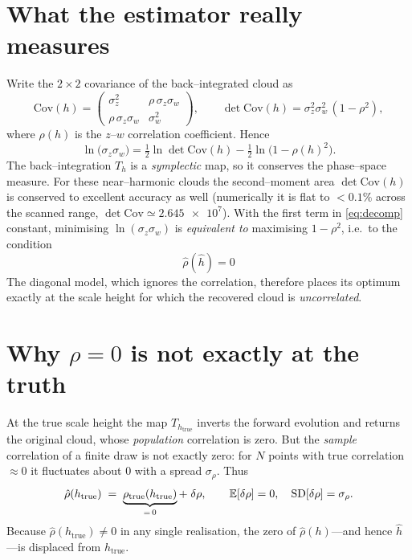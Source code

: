 \documentclass[11pt]{article}
\newcommand{\htrue}{h_{\mathrm{true}}}
\newcommand{\hhat}{\hat h}
\newcommand{\dz}{\sigma_z}
\newcommand{\dw}{\sigma_w}
\newcommand{\rhohat}{\hat\rho}
\newcommand{\Cov}{\mathrm{Cov}}
\begin{document}
\section{What the estimator really measures}
Write the $2\times2$ covariance of the back--integrated cloud as
\begin{equation}
  \Cov(h) =
  \begin{pmatrix} \dz^2 & \rho\,\dz\dw \\ \rho\,\dz\dw & \dw^2 \end{pmatrix},
  \qquad
  \det\Cov(h) = \dz^2\dw^2\,(1-\rho^2),
\end{equation}
where $\rho(h)$ is the $z$--$w$ correlation coefficient. Hence
\begin{equation}
  \ln\big(\dz\dw\big) = \tfrac12\ln\det\Cov(h) - \tfrac12\ln\!\big(1-\rho(h)^2\big).
  \label{eq:decomp}
\end{equation}
The back--integration $T_h$ is a \emph{symplectic} map, so it conserves the
phase--space measure. For these near--harmonic clouds the second--moment area
$\det\Cov(h)$ is conserved to excellent accuracy as well (numerically it is flat
to $<0.1\%$ across the scanned range, $\det\Cov\simeq\num{2.645e7}$). With the
first term in \eqref{eq:decomp} constant, minimising $\ln(\dz\dw)$ is
\emph{equivalent to} maximising $1-\rho^2$, i.e.\ to the condition
\begin{equation}
  \boxed{\;\rhohat(\hhat)=0\;}
  \label{eq:estimating}
\end{equation}
The diagonal model, which ignores the correlation, therefore places its optimum
exactly at the scale height for which the recovered cloud is \emph{uncorrelated}.

\section{Why $\rho=0$ is not exactly at the truth}
At the true scale height the map $T_{\htrue}$ inverts the forward evolution and
returns the original cloud, whose \emph{population} correlation is zero. But the
\emph{sample} correlation of a finite draw is not exactly zero: for $N$ points
with true correlation $\approx0$ it fluctuates about $0$ with a spread
$\sigma_\rho$. Thus
\begin{equation}
  \rhohat(\htrue) \;=\; \underbrace{\rho_{\rm true}(\htrue)}_{=\,0} + \;\delta\rho,
  \qquad \mathbb E[\delta\rho]=0,\quad \mathrm{SD}[\delta\rho]=\sigma_\rho .
\end{equation}
Because $\rhohat(\htrue)\neq0$ in any single realisation, the zero of
$\rhohat(h)$---and hence $\hhat$---is displaced from $\htrue$.
\end{document}
